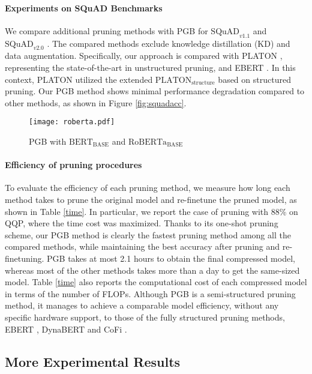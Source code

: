\paragraph{Experiments on SQuAD Benchmarks}\label{app:squad} 

We compare additional pruning methods with PGB for $\text{SQuAD}_{v1.1}$ \cite{SQuAD} and $\text{SQuAD}_{v2.0}$ \cite{SQuAD2}. The compared methods exclude knowledge distillation (KD) and data augmentation. Specifically, our approach is compared with PLATON \cite{platon}, representing the state-of-the-art in unstructured pruning, and EBERT \cite{ebert}. In this context, PLATON utilized the extended $\text{PLATON}_{\text{structure}}$ based on structured pruning. Our PGB method shows minimal performance degradation compared to other methods, as shown in Figure \ref{fig:squadacc}.


\begin{figure*}[t!]
    \centering
    {\texttt{[image: roberta.pdf]}}
    \caption{PGB with $\text{BERT}_{\text{BASE}}$ and $\text{RoBERTa}_{\text{BASE}}$ }
    \label{fig:roberta}
\end{figure*}

\paragraph{Efficiency of pruning procedures}
To evaluate the efficiency of each pruning method, we measure how long each method takes to prune the original model and re-finetune the pruned model, as shown in Table \ref{time}. In particular, we report the case of pruning with 88\% on QQP, where the time cost was maximized. Thanks to its one-shot pruning scheme, our PGB method is clearly the fastest pruning method among all the compared methods, while maintaining the best accuracy after pruning and re-finetuning. PGB takes at most 2.1 hours to obtain the final compressed model, whereas most of the other methods takes more than a day to get the same-sized model. Table \ref{time} also reports the computational cost of each compressed model in terms of the number of FLOPs. Although PGB is a semi-structured pruning method, it manages to achieve a comparable model efficiency, without any specific hardware support, to those of the fully structured pruning methods, EBERT \cite{ebert}, DynaBERT \cite{DynaBERT} and CoFi \cite{Xia}.


\subsection{More Experimental Results}
